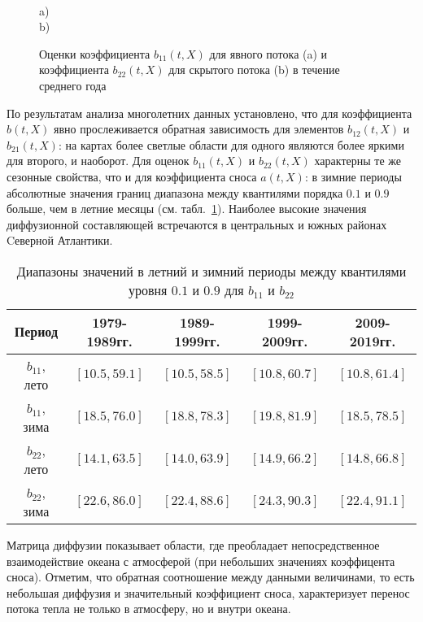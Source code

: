 \begin{figure}[!h]
	\\
	a)
	\\
	b)
	
	\caption{Оценки коэффициента $b_{11}(t,X)$ для явного потока (a) и коэффициента $b_{22}(t,X)$ для скрытого потока (b) в течение среднего года}
	\label{fig_b_mean_year}
\end{figure} 

По результатам анализа многолетних данных установлено, что для коэффициента $b(t,X)$ явно прослеживается обратная зависимость для элементов $b_{12}(t,X)$ и $b_{21}(t,X)$: на картах более светлые области для одного являются более яркими для второго, и наоборот. Для оценок $b_{11}(t,X)$ и $b_{22}(t,X)$ характерны те же сезонные свойства, что и для коэффициента сноса $a(t,X)$: в зимние периоды абсолютные значения границ диапазона между квантилями порядка $0.1$ и $0.9$ больше, чем в летние месяцы (см. табл.~\ref{table_quantiles_b}). Наиболее высокие значения диффузионной составляющей встречаются в центральных и южных районах Cеверной Атлантики. 

\begin{table}[h!]
	\centering
	\caption{Диапазоны значений в летний и зимний периоды между квантилями уровня $0.1$ и $0.9$ для $b_{11}$ и $b_{22}$}
	\begin{tabular}{|c|c|c|c|c|}
		\hline
		Период & 1979-1989гг. &  1989-1999гг. & 1999-2009гг. & 2009-2019гг.\\
		\hline
		$b_{11}$, лето & $[10.5, 59.1]$ & $[10.5, 58.5]$ & $[10.8, 60.7]$ & $[10.8, 61.4]$\\ 
		\hline
		$b_{11}$, зима & $[18.5, 76.0]$ & $[18.8, 78.3]$ & $[19.8, 81.9]$ & $[18.5, 78.5]$\\ 
		\hline
		$b_{22}$, лето & $[14.1, 63.5]$ & $[14.0, 63.9]$ & $[14.9, 66.2]$ & $[14.8, 66.8]$\\ 
		\hline
		$b_{22}$, зима & $[22.6, 86.0]$ & $[22.4, 88.6]$ & $[24.3, 90.3]$ & $[22.4, 91.1]$\\ 
		\hline
	\end{tabular}
	\label{table_quantiles_b}
\end{table}


Матрица диффузии показывает области, где преобладает непосредственное взаимодействие океана с атмосферой (при небольших значениях коэффицента сноса). Отметим, что обратная соотношение между данными величинами, то есть небольшая диффузия и значительный коэффициент сноса,  характеризует перенос потока тепла не только в атмосферу, но и внутри океана.

